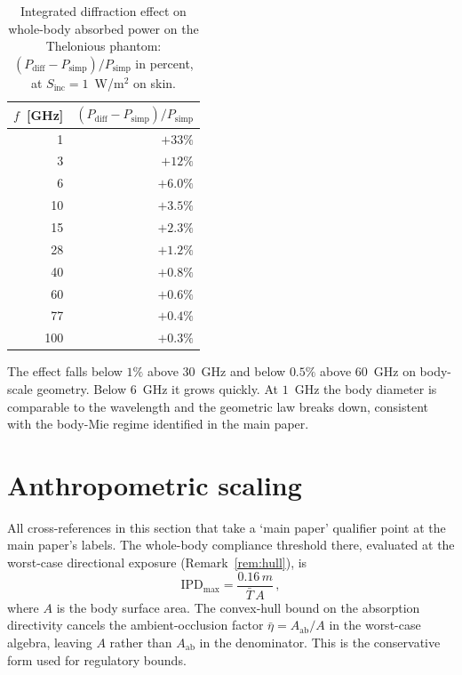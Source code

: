 \documentclass[journal,twocolumn,10pt]{IEEEtran}
\theoremstyle{plain}
\theoremstyle{remark}
\newcommand{\IPD}{\mathrm{IPD}}
\newcommand{\Aab}{A_{\mathrm{ab}}}
\newcommand{\Tbar}{\bar{T}}
\begin{document}
\begin{table}[!t]
\centering
\caption{Integrated diffraction effect on whole-body absorbed power
on the Thelonious phantom: $(P_{\mathrm{diff}} -
P_{\mathrm{simp}})/P_{\mathrm{simp}}$ in percent, at $S_{\mathrm{inc}}
= 1$~W/m$^2$ on skin.}
\label{tab:si-diffraction}
\begin{tabular}{rr}
\toprule
$f$~[GHz] & $(P_{\mathrm{diff}}-P_{\mathrm{simp}})/P_{\mathrm{simp}}$ \\
\midrule
1   & $+33\%$ \\
3   & $+12\%$ \\
6   & $+6.0\%$ \\
10  & $+3.5\%$ \\
15  & $+2.3\%$ \\
28  & $+1.2\%$ \\
40  & $+0.8\%$ \\
60  & $+0.6\%$ \\
77  & $+0.4\%$ \\
100 & $+0.3\%$ \\
\bottomrule
\end{tabular}
\end{table}

The effect falls below $1\%$ above $30$~GHz and below $0.5\%$ above
$60$~GHz on body-scale geometry. Below $6$~GHz it grows quickly. At
$1$~GHz the body diameter is comparable to the wavelength and the
geometric law breaks down, consistent with the body-Mie regime
identified in the main paper.


\section{Anthropometric scaling}\label{si:anthro}

All cross-references in this section that take a `main paper'
qualifier point at the main paper's labels. The whole-body
compliance threshold there, evaluated at the worst-case directional
exposure (Remark~\ref{rem:hull}), is
\begin{equation}\label{eq:Sinc-max-SI}
  \IPD_{\mathrm{max}} = \frac{0.16\,m}{\Tbar\,A}\, ,
\end{equation}
where $A$ is the body surface area. The convex-hull bound on the
absorption directivity cancels the ambient-occlusion factor
$\bar\eta = \Aab/A$ in the worst-case algebra, leaving $A$ rather
than $\Aab$ in the denominator. This is the conservative form used
for regulatory bounds.
\end{document}
